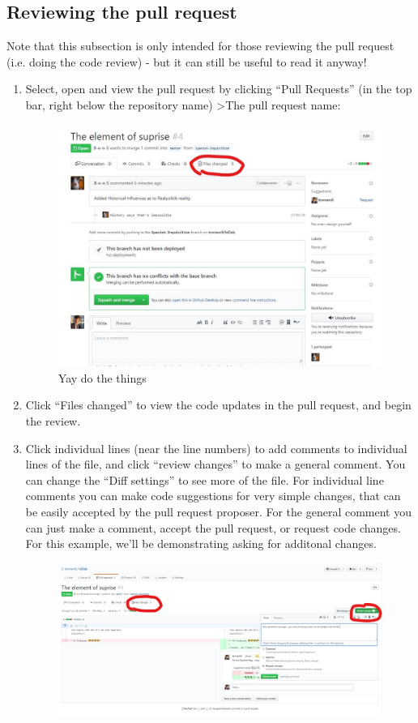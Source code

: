 \documentclass[11pt, titlepage]{article}
\begin{document}
\subsection{Reviewing the pull request}
\label{BPRW_reviewing_pull_request}
Note that this subsection is only intended for those reviewing the pull request (i.e. doing the code review) - but it can still be useful to read it anyway!
\begin{enumerate}
	\item Select, open and view the pull request by clicking ``Pull Requests'' (in the top bar, right below the repository name) \textgreater The pull request name:
	\begin{figure}[H]
		\centering
		\includegraphics[width=\textwidth]{BPRW/6view-pull-request}
		\caption{Yay do the things}
	\end{figure}
	\item Click ``Files changed'' to view the code updates in the pull request, and begin the review.
	\item Click individual lines (near the line numbers) to add comments to individual lines of the file, and click ``review changes'' to make a general comment. You can change the ``Diff settings'' to see more of the file. For individual line comments you can make code suggestions for very simple changes, that can be easily accepted by the pull request proposer. For the general comment you can just make a comment, accept the pull request, or request code changes. For this example, we'll be demonstrating asking for additonal changes.
	\begin{figure}[H]
		\centering
		\includegraphics[width=\textwidth]{BPRW/7code-review}

\end{figure}
\end{enumerate}
\end{document}
